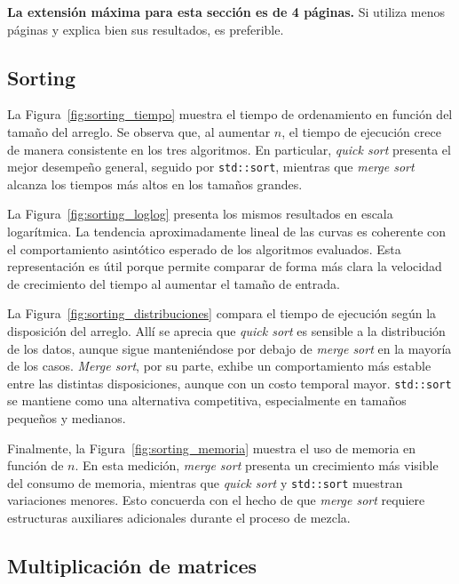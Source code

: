 \begin{mdframed}
    \textbf{La extensión máxima para esta sección es de 4 páginas.} Si utiliza menos páginas y explica bien sus resultados, es preferible.
\end{mdframed}

\subsection{Sorting}

La Figura~\ref{fig:sorting_tiempo} muestra el tiempo de ordenamiento en función del tamaño del arreglo. Se observa que, al aumentar $n$, el tiempo de ejecución crece de manera consistente en los tres algoritmos. En particular, \textit{quick sort} presenta el mejor desempeño general, seguido por \texttt{std::sort}, mientras que \textit{merge sort} alcanza los tiempos más altos en los tamaños grandes.  

La Figura~\ref{fig:sorting_loglog} presenta los mismos resultados en escala logarítmica. La tendencia aproximadamente lineal de las curvas es coherente con el comportamiento asintótico esperado de los algoritmos evaluados. Esta representación es útil porque permite comparar de forma más clara la velocidad de crecimiento del tiempo al aumentar el tamaño de entrada.

La Figura~\ref{fig:sorting_distribuciones} compara el tiempo de ejecución según la disposición del arreglo. Allí se aprecia que \textit{quick sort} es sensible a la distribución de los datos, aunque sigue manteniéndose por debajo de \textit{merge sort} en la mayoría de los casos. \textit{Merge sort}, por su parte, exhibe un comportamiento más estable entre las distintas disposiciones, aunque con un costo temporal mayor. \texttt{std::sort} se mantiene como una alternativa competitiva, especialmente en tamaños pequeños y medianos.

Finalmente, la Figura~\ref{fig:sorting_memoria} muestra el uso de memoria en función de $n$. En esta medición, \textit{merge sort} presenta un crecimiento más visible del consumo de memoria, mientras que \textit{quick sort} y \texttt{std::sort} muestran variaciones menores. Esto concuerda con el hecho de que \textit{merge sort} requiere estructuras auxiliares adicionales durante el proceso de mezcla.

\subsection{Multiplicación de matrices}

